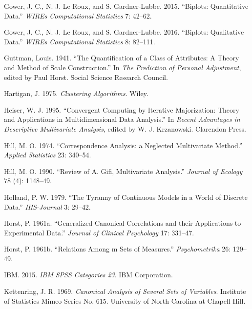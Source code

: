 \documentclass[
  12pt,
  letterpaper,
  DIV=11,
  numbers=noendperiod]{scrreprt}
\newlength{\cslhangindent}
\newenvironment{CSLReferences}[2] %
 {\begin{list}{}{%
  \setlength{\itemindent}{0pt}
  \setlength{\leftmargin}{0pt}
  \setlength{\parsep}{0pt}
  \ifodd #1
   \setlength{\leftmargin}{\cslhangindent}
   \setlength{\itemindent}{-1\cslhangindent}
  \fi
  \setlength{\itemsep}{#2\baselineskip}}}
 {\end{list}}
\begin{document}
\begin{CSLReferences}{1}{1}
Gower, J. C., N. J. Le Roux, and S. Gardner-Lubbe. 2015. {``{Biplots:
Quantitative Data}.''} \emph{WIREs Computational Statistics} 7: 42--62.

Gower, J. C., N. J. Le Roux, and S. Gardner-Lubbe. 2016. {``{Biplots:
Qualitative Data}.''} \emph{WIREs Computational Statistics} 8: 82--111.

Guttman, Louis. 1941. {``{The Quantification of a Class of Attributes: A
Theory and Method of Scale Construction}.''} In \emph{The Prediction of
Personal Adjustment}, edited by Paul Horst. Social Science Research
Council.

Hartigan, J. 1975. \emph{Clustering Algorithms}. Wiley.

Heiser, W. J. 1995. {``{Convergent Computing by Iterative Majorization:
Theory and Applications in Multidimensional Data Analysis}.''} In
\emph{Recent Advantages in Descriptive Multivariate Analysis}, edited by
W. J. Krzanowski. Clarendon Press.

Hill, M. O. 1974. {``{Correspondence Analysis: a Neglected Multivariate
Method}.''} \emph{Applied Statistics} 23: 340--54.

Hill, M. O. 1990. {``{Review of A. Gifi, Multivariate Analysis}.''}
\emph{Journal of Ecology} 78 (4): 1148--49.

Holland, P. W. 1979. {``{The Tyranny of Continuous Models in a World of
Discrete Data}.''} \emph{IHS-Journal} 3: 29--42.

Horst, P. 1961a. {``{Generalized Canonical Correlations and their
Applications to Experimental Data}.''} \emph{Journal of Clinical
Psychology} 17: 331--47.

Horst, P. 1961b. {``{Relations Among m Sets of Measures}.''}
\emph{Psychometrika} 26: 129--49.

IBM. 2015. \emph{IBM SPSS Categories 23}. IBM Corporation.

Kettenring, J. R. 1969. \emph{{Canonical Analysis of Several Sets of
Variables}}. Institute of Statistics Mimeo Series No. 615. University of
North Carolina at Chapell Hill.


\end{CSLReferences}
\end{document}
